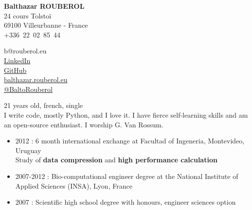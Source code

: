 


\pagestyle{empty}

\begin{minipage}{0.6\textwidth}
\raggedright
{
        \textbf{\huge Balthazar ROUBEROL}\\
        \medskip
        {\scriptsize 24 cours Tolstoï \\
        69100 Villeurbanne - France \\
        +336~22~02~85~44 \\
        }
}
\end{minipage}
\begin{minipage}{0.395\textwidth}
\raggedleft
{	
		{\scriptsize
		b@rouberol.eu\\
		\href{http://www.linkedin.com/profile/view?id=148957121\&locale=en\_US\&trk=tab\_pro}{LinkedIn}\\
		\href{https://github.com/BaltoRouberol}{GitHub}\\
		\href{http://balthazar.rouberol.eu}{balthazar.rouberol.eu}\\
        \href{https://twitter.com/BaltoRouberol}{@BaltoRouberol}\\
        
        }
}
\end{minipage}

\bigskip


{\scriptsize 21 years old, french, single\\I write code, mostly Python, and I love it. I have fierce self-learning skills and am an open-source enthusiast. I worship G. Van Rossum.}\\

\vspace{-7mm}

\begin{itemize}
\renewcommand{\labelitemi}{$\circ$}
		\item 2012 : 6 month international exchange at Facultad of Ingeneria, Montevideo, Uruguay\\ Study of \textbf{data compression} and \textbf{high performance calculation}
        \item 2007-2012 : Bio-computational engineer degree at the National Institute of Applied Sciences (INSA), Lyon, France
        \item 2007 : Scientific high school degree with honours, engineer sciences option
\end{itemize}

